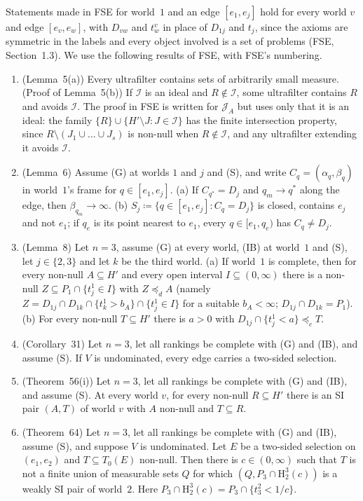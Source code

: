 \documentclass[11pt]{article}
\theoremstyle{definition}\newtheorem{definition}[theorem]{Definition}
\theoremstyle{remark}\newtheorem{remark}[theorem]{Remark}
\newcommand{\Jid}{\mathcal J}
\newcommand{\Iid}{\mathcal I}
\newcommand{\Hi}[3]{\mathrm H^{#1}_{#2}(#3)}
\begin{document}
Statements made in FSE for world~$1$ and an edge $[e_1,e_j]$ hold for every
world $v$ and edge $[e_v,e_w]$, with $D_{vw}$ and $t^v_w$ in place of
$D_{1j}$ and $t_j$, since the axioms are symmetric in the labels and every
object involved is a set of problems (FSE, Section~1.3). We use the
following results of FSE, with FSE's numbering.
\begin{enumerate}[label=(F\arabic*),leftmargin=*,itemsep=3pt]
\item\label{in:uf} (Lemma~5(a)) Every ultrafilter contains sets of
arbitrarily small measure. (Proof of Lemma~5(b)) If $\Iid$ is an ideal and
$R\notin\Iid$, some ultrafilter contains $R$ and avoids $\Iid$. The proof in
FSE is written for $\Jid_A$ but uses only that it is an ideal: the family
$\{R\}\cup\{H'\setminus J:J\in\Iid\}$ has the finite intersection property,
since $R\setminus(J_1\cup\dots\cup J_s)$ is non-null when $R\notin\Iid$, and
any ultrafilter extending it avoids $\Iid$.
\item\label{in:ends} (Lemma~6) Assume (G) at worlds $1$ and $j$ and (S),
and write $C_q=(\alpha_q,\beta_q)$ in world~$1$'s frame for
$q\in[e_1,e_j]$. (a) If $C_{q^*}=D_j$ and $q_m\to q^*$ along the edge, then
$\beta_{q_m}\to\infty$. (b) $S_j\coloneqq\{q\in[e_1,e_j]:C_q=D_j\}$ is
closed, contains $e_j$ and not $e_1$; if $q_e$ is its point nearest to
$e_1$, every $q\in[e_1,q_e)$ has $C_q\ne D_j$.
\item\label{in:yard} (Lemma~8) Let $n=3$, assume (G) at every world, (IB)
at world~$1$ and (S), let $j\in\{2,3\}$ and let $k$ be the third world.
(a) If world~$1$ is complete, then for every non-null $A\subseteq H'$ and
every open interval $I\subseteq(0,\infty)$ there is a non-null
$Z\subseteq P_1\cap\{t^1_j\in I\}$ with $Z\preceq_dA$ (namely
$Z=D_{1j}\cap D_{1k}\cap\{t^1_k>b_A\}\cap\{t^1_j\in I\}$ for a suitable
$b_A<\infty$; $D_{1j}\cap D_{1k}=P_1$). (b) For every non-null $T\subseteq H'$ there is
$a>0$ with $D_{1j}\cap\{t^1_j<a\}\preceq_cT$.
\item\label{in:edge} (Corollary~31) Let $n=3$, let all rankings be complete
with (G) and (IB), and assume (S). If $V$ is undominated, every edge carries
a two-sided selection.
\item\label{in:LH} (Theorem~56(i)) Let $n=3$, let all rankings be complete
with (G) and (IB), and assume (S). At every world $v$, for every non-null
$R\subseteq H'$ there is an SI pair $(A,T)$ of world $v$ with $A$ non-null
and $T\subseteq R$.
\item\label{in:own} (Theorem~64) Let $n=3$, let all rankings be complete
with (G) and (IB), assume (S), and suppose $V$ is undominated. Let $E$ be a
two-sided selection on $(e_1,e_2)$ and $T\subseteq T_0(E)$ non-null. Then
there is $c\in(0,\infty)$ such that $T$ is not a finite union of measurable
sets $Q$ for which $(Q,P_3\cap\Hi32c)$ is a weakly SI pair of world~$2$.
Here $P_3\cap\Hi32c=P_3\cap\{t^2_3<1/c\}$.
\end{enumerate}
\end{document}
